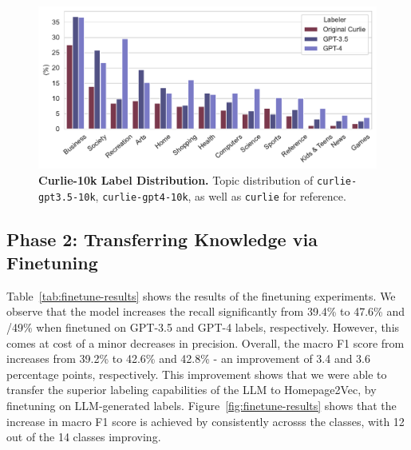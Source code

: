 \begin{figure}[!ht]
    \centering
    \includegraphics[width=.8\columnwidth]{figures/curlie-10k-dist.pdf}
    \caption{\textbf{Curlie-10k Label Distribution.} Topic distribution of \texttt{curlie-gpt3.5-10k}, \texttt{curlie-gpt4-10k}, as well as \texttt{curlie} for reference.}
    \label{fig:curlie-10k-dist}
\end{figure}

\subsection*{Phase 2: Transferring Knowledge via Finetuning}

Table~\ref{tab:finetune-results} shows the results of the finetuning experiments. 
We observe that the model increases the recall significantly from 39.4\% to 47.6\% and /49\% when finetuned on GPT-3.5 and GPT-4 labels, respectively.
However, this comes at cost of a minor decreases in precision. Overall, the macro F1 score from increases from 39.2\% to 42.6\% and 42.8\% - an improvement of 3.4 and 3.6 percentage points, respectively.
This improvement shows that we were able to transfer the superior labeling capabilities of the LLM to Homepage2Vec, by finetuning on LLM-generated labels. Figure~\ref{fig:finetune-results} shows that the increase in macro F1 score is achieved by consistently acrosss the classes, with 12 out of the 14 classes improving.




